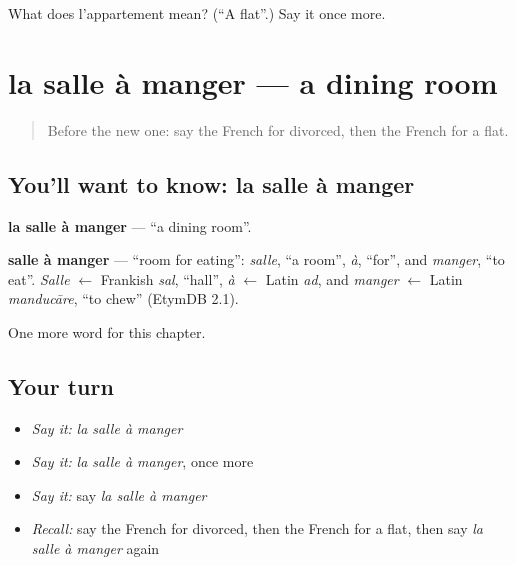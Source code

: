 \begin{tcolorbox}[breakable,colback=teal!4,colframe=teal!35!black,title={Before you move on}]
What does l'appartement mean? (\textquotedblleft{}A flat\textquotedblright{}.) Say it once more.
\end{tcolorbox}
\section[la salle à manger]{la salle à manger — a dining room}

\label{lesson:FR-C163-salle-a-manger}



\begin{quote}
Before the new one: say the French for divorced, then the French for a flat.
\end{quote}

\subsection*{You'll want to know: la salle à manger}
\textbf{la salle à manger} — \textquotedblleft{}a dining room\textquotedblright{}.

\begin{cousinweb}
\textbf{salle à manger} — \textquotedblleft{}room for eating\textquotedblright{}: \emph{salle}, \textquotedblleft{}a room\textquotedblright{}, \emph{à}, \textquotedblleft{}for\textquotedblright{}, and \emph{manger}, \textquotedblleft{}to eat\textquotedblright{}. \emph{Salle} $\leftarrow$ Frankish \emph{sal}, \textquotedblleft{}hall\textquotedblright{}, \emph{à} $\leftarrow$ Latin \emph{ad}, and \emph{manger} $\leftarrow$ Latin \emph{manducāre}, \textquotedblleft{}to chew\textquotedblright{} (EtymDB 2.1).
\end{cousinweb}

\begin{grammarlens}[title={What you've built}]
One more word for this chapter.
\end{grammarlens}

\subsection*{Your turn}
\begin{itemize}
\raggedright
  \item \emph{Say it:} \emph{la salle à manger}
  \item \emph{Say it:} \emph{la salle à manger}, once more
  \item \emph{Say it:} say \emph{la salle à manger}
  \item \emph{Recall:} say the French for divorced, then the French for a flat, then say \emph{la salle à manger} again
\end{itemize}

